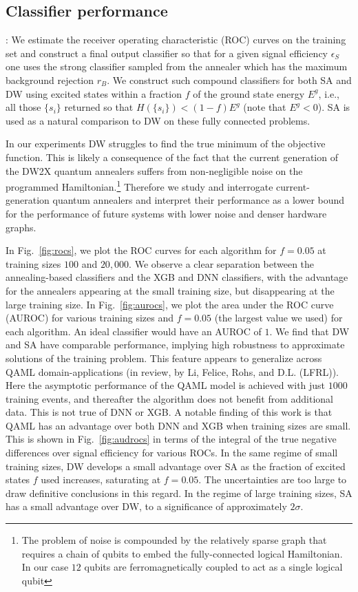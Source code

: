 \documentclass[.chapters/Higgs/.chapters/Higgs/main.tex]{subfiles}
\begin{document}
\subsection*{Classifier performance}:
We estimate the receiver operating characteristic  (ROC) curves on the training set and construct a final output classifier so that for a given signal efficiency $\epsilon_S$ one uses the strong classifier sampled from the annealer which has the maximum background rejection $r_B$. We construct such compound classifiers for both SA and DW using excited states within a fraction $f$ of the ground state energy $E^g$, i.e., all those $\{s_i\}$ returned so that $H(\{s_i\})<(1-f)E^g$ (note that $E^g<0$). SA is used as a natural comparison to DW on these fully connected problems.

In our experiments DW struggles to find the true minimum of the objective function. This is likely a consequence of the fact that the current generation of the DW2X quantum annealers suffers from non-negligible noise on the programmed Hamiltonian.\footnote{The problem of noise is compounded by the relatively sparse graph that requires a chain of qubits to embed the fully-connected logical Hamiltonian. In our case  $12$ qubits are ferromagnetically coupled  to act as a single logical qubit} Therefore we study and  interrogate current-generation quantum annealers and interpret their performance as a lower bound for the performance of future systems with lower noise and denser hardware graphs. 

In Fig.~\ref{fig:rocs}, we plot the ROC curves for each algorithm for $f=0.05$ at training sizes $100$ and $20,000$.  We observe a clear separation between the annealing-based classifiers and the XGB and DNN classifiers, with the advantage for the annealers appearing at the small training size, but disappearing at the large training size. In Fig.~\ref{fig:aurocs}, we plot the area under the ROC curve (AUROC) for various training sizes and $f=0.05$ (the largest value we used)  for each algorithm. An ideal classifier would have an AUROC of $1$. We find that DW and SA have comparable performance, implying high robustness to approximate solutions of the training problem. This feature appears to generalize across QAML domain-applications (in review, by Li, Felice, Rohs, and D.L. (LFRL)).
Here the  asymptotic performance of the QAML model is achieved with just $1000$ training events, and thereafter the algorithm does not benefit from additional data.  This is not true of DNN or XGB. A notable finding of this work is that QAML has an advantage over both DNN and XGB when training sizes are small. This is shown in Fig.~\ref{fig:audrocs} in terms of the integral of the true negative differences over signal efficiency for various ROCs. In the same regime of small training sizes, DW develops a small advantage over SA as the fraction of excited states $f$ used increases, saturating at $f=0.05$. The uncertainties are too large to draw definitive conclusions in this regard. In the regime of large training sizes, SA has a small advantage over DW, to a significance of approximately $2\sigma$.
\end{document}
